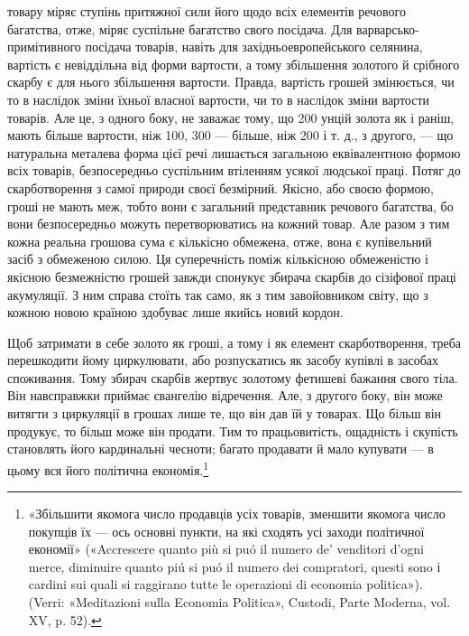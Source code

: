 \parcont{}  %
товару міряє ступінь притяжної сили його щодо всіх елементів
речового багатства, отже, міряє суспільне багатство свого посідача.
Для варварсько-примітивного посідача товарів, навіть
для західньоевропейського селянина, вартість є невіддільна від
форми вартости, а тому збільшення золотого й срібного скарбу
є для нього збільшення вартости. Правда, вартість грошей змінюється,
чи то в наслідок зміни їхньої власної вартости, чи то
в наслідок зміни вартости товарів. Але це, з одного боку, не
заважає тому, що 200 унцій золота як і раніш, мають більше
вартости, ніж 100, 300 — більше, ніж 200 і т. д., з другого, —
що натуральна металева форма цієї речі лишається загальною
еквівалентною формою всіх товарів, безпосередньо суспільним
втіленням усякої людської праці. Потяг до скарботворення з
самої природи своєї безмірний. Якісно, або своєю формою, гроші
не мають меж, тобто вони є загальний представник речового
багатства, бо вони безпосередньо можуть перетворюватись на
кожний товар. Але разом з тим кожна реальна грошова сума є
кількісно обмежена, отже, вона є купівельний засіб з обмеженою
силою. Ця суперечність поміж кількісною обмеженістю і якісною
безмежністю грошей завжди спонукує збирача скарбів до сізіфової
праці акумуляції. З ним справа стоїть так само, як з
тим завойовником світу, що з кожною новою країною здобуває
лише якийсь новий кордон.

Щоб затримати в себе золото як гроші, а тому і як елемент
скарботворення, треба перешкодити йому циркулювати, або розпускатись
як засобу купівлі в засобах споживання. Тому збирач
скарбів жертвує золотому фетишеві бажання свого тіла.
Він навсправжки приймає євангелію відречення. Але, з другого
боку, він може витягти з циркуляції в грошах лише те, що він
дав їй у товарах. Що більш він продукує, то більш може він
продати. Тим то працьовитість, ощадність і скупість становлять
його кардинальні чесноти; багато продавати й мало купувати —
в цьому вся його політична економія.\footnote{
«Збільшити якомога число продавців усіх товарів, зменшити якомога
число покупців їх — ось основні пункти, на які сходять усі заходи
політичної економії» («Accrescere quanto più si puó il numero de’ venditori
d’ogni merce, diminuire quanto piú si puó il numero dei compratori, questi
sono і cardini sui quali si raggirano tutte le operazioni di economia politica»).
(Verri: «Meditazioni sulla Economia Politica», Custodi, Parte \emph{}Moderna,
vol. XV, p. 52).
}

